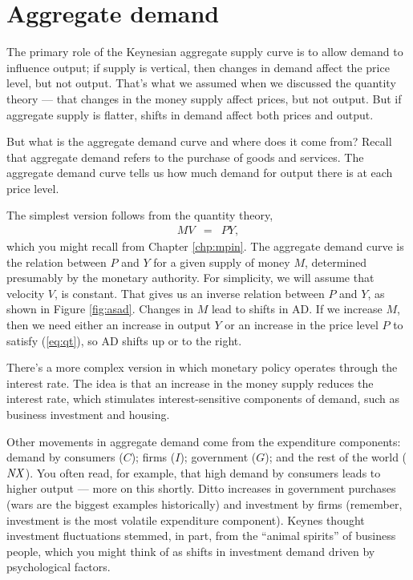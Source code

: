 \section{Aggregate demand }


The primary role of the Keynesian aggregate supply curve is to
allow demand to influence output;
if supply is vertical, then changes in demand affect the price level,
but not output.
That's what we assumed when we discussed the quantity theory --- that changes in the money supply affect prices, but not output.
But if aggregate supply is flatter,
shifts in demand affect both prices and output.

But what is the aggregate demand curve and where does it come from?
Recall that aggregate demand
 refers to the purchase of goods and services.
The aggregate demand
 curve tells us how much demand for output
there is at each price level.

The simplest version follows from the quantity theory,
\begin{eqnarray}
    M V &=& P Y ,
    \label{eq:qt}
\end{eqnarray}
which you might recall from Chapter \ref{chp:mpin}.
The aggregate demand
 curve is the relation between $P$ and $Y$ for a
given supply of money $M$,
determined presumably by the monetary authority.
For simplicity, we will assume that velocity $V$, is constant.
That gives us an inverse relation between $P$ and $Y$,
as shown in Figure \ref{fig:asad}.
Changes in $M$ lead to shifts in AD.
If we increase $M$, then we need either an increase in output $Y$
or an increase in the price level $P$ to satisfy (\ref{eq:qt}),
so AD shifts up or to the right.

There's a more complex version in which monetary policy operates
through the interest rate.
The idea is that an increase in the money supply reduces
the interest rate,
which stimulates interest-sensitive components of demand,
such as business investment and housing.

Other movements in aggregate demand
 come from the expenditure components:
demand by consumers ($C$); firms ($I$); government ($G$);
and the rest of the world ($\mbox{\em NX\/}$).
You often read, for example, that high demand by consumers
leads to higher output --- more on this shortly.
Ditto increases in government purchases
(wars are the biggest examples historically)
and investment by firms (remember, investment is the most volatile
expenditure component).
Keynes thought investment fluctuations stemmed,
in part, from the ``animal spirits'' of business people,
which you might think of as shifts in investment demand
driven by psychological factors.


